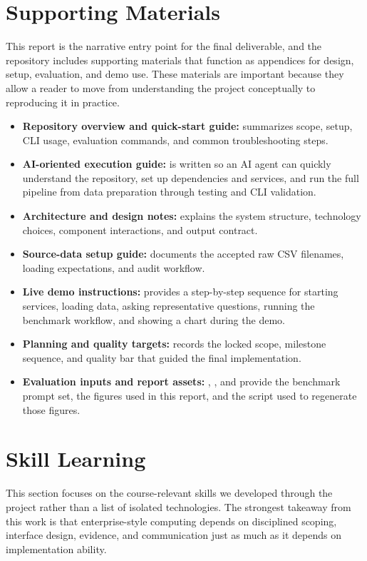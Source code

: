 \documentclass[11pt]{article}
\begin{document}
\section{Supporting Materials}
This report is the narrative entry point for the final deliverable, and the repository includes supporting materials that function as appendices for design, setup, evaluation, and demo use. These materials are important because they allow a reader to move from understanding the project conceptually to reproducing it in practice.

\begingroup
\sloppy
\begin{itemize}[leftmargin=1.5em]
    \item \textbf{Repository overview and quick-start guide:}  summarizes scope, setup, CLI usage, evaluation commands, and common troubleshooting steps.
    \item \textbf{AI-oriented execution guide:}  is written so an AI agent can quickly understand the repository, set up dependencies and services, and run the full pipeline from data preparation through testing and CLI validation.
    \item \textbf{Architecture and design notes:}  explains the system structure, technology choices, component interactions, and output contract.
    \item \textbf{Source-data setup guide:}  documents the accepted raw CSV filenames, loading expectations, and audit workflow.
    \item \textbf{Live demo instructions:}  provides a step-by-step sequence for starting services, loading data, asking representative questions, running the benchmark workflow, and showing a chart during the demo.
    \item \textbf{Planning and quality targets:}  records the locked scope, milestone sequence, and quality bar that guided the final implementation.
    \item \textbf{Evaluation inputs and report assets:} , , and  provide the benchmark prompt set, the figures used in this report, and the script used to regenerate those figures.
\end{itemize}
\endgroup

\section{Skill Learning}
This section focuses on the course-relevant skills we developed through the project rather than a list of isolated technologies. The strongest takeaway from this work is that enterprise-style computing depends on disciplined scoping, interface design, evidence, and communication just as much as it depends on implementation ability.
\end{document}
